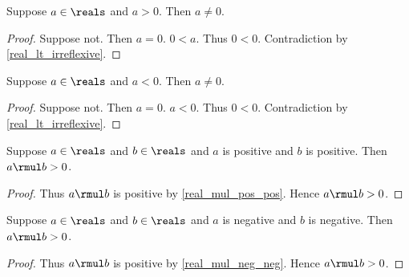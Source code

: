 \begin{lemma}\label{real_pos_nonzero}
    Suppose $a\in\reals$ and $a > 0$.
    Then $a \neq 0$.
\end{lemma}
\begin{proof}
    Suppose not.
    Then $a = 0$.
    $0 < a$.
    Thus $0 < 0$.
    Contradiction by \cref{real_lt_irreflexive}.
\end{proof}

\begin{lemma}\label{real_neg_nonzero}
    Suppose $a\in\reals$ and $a < 0$.
    Then $a \neq 0$.
\end{lemma}
\begin{proof}
    Suppose not.
    Then $a = 0$.
    $a < 0$.
    Thus $0 < 0$.
    Contradiction by \cref{real_lt_irreflexive}.
\end{proof}

\begin{theorem}\label{real_mul_pos_pos_gt}
    Suppose $a\in\reals$ and $b\in\reals$ and $a$ is positive and $b$ is positive.
    Then $a \rmul b > 0$.
\end{theorem}
\begin{proof}
    Thus $a \rmul b$ is positive by \cref{real_mul_pos_pos}.
    Hence $a \rmul b > 0$.
\end{proof}

\begin{theorem}\label{real_mul_neg_neg_gt}
    Suppose $a\in\reals$ and $b\in\reals$ and $a$ is negative and $b$ is negative.
    Then $a \rmul b > 0$.
\end{theorem}
\begin{proof}
    Thus $a \rmul b$ is positive by \cref{real_mul_neg_neg}.
    Hence $a \rmul b > 0$.
\end{proof}

